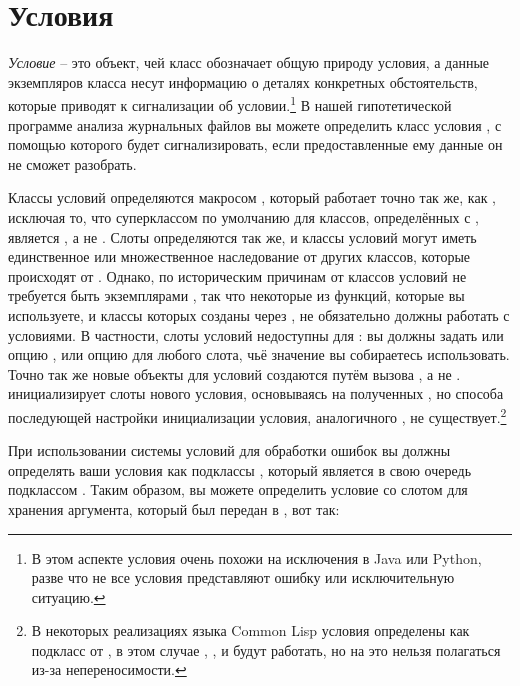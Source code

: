 \section{Условия}

\textit{Условие} -- это объект, чей класс обозначает общую природу условия, а данные
экземпляров класса несут информацию о деталях конкретных обстоятельств, которые приводят к
сигнализации об условии.\footnote{В этом аспекте условия очень похожи на исключения в Java
  или Python, разве что не все условия представляют ошибку или исключительную ситуацию.} В
нашей гипотетической программе анализа журнальных файлов вы можете определить класс
условия , с помощью которого  будет
сигнализировать, если предоставленные ему данные он не сможет разобрать.

Классы условий определяются макросом , который работает точно так
же, как , исключая то, что суперклассом по умолчанию для классов,
определённых с , является , а не
. Слоты определяются так же, и классы условий могут иметь
единственное или множественное наследование от других классов, которые происходят от
. Однако, по историческим причинам от классов условий не требуется быть
экземплярами , так что некоторые из функций, которые вы используете,
и классы которых созданы через , не обязательно должны работать с
условиями. В частности, слоты условий недоступны для : вы должны задать
или опцию , или опцию  для любого слота, чьё значение вы
собираетесь использовать. Точно так же новые объекты для условий создаются путём вызова
, а не .  инициализирует
слоты нового условия, основываясь на полученных , но способа последующей
настройки инициализации условия, аналогичного , не
существует.\footnote{В некоторых реализациях языка Common Lisp условия определены как
  подкласс от , в этом случае ,
  , и  будут работать, но на это нельзя
  полагаться из-за непереносимости.}

При использовании системы условий для обработки ошибок вы должны определять ваши условия
как подклассы , который является в свою очередь подклассом
. Таким образом, вы можете определить условие
 со слотом для хранения аргумента, который был передан в
, вот так:

